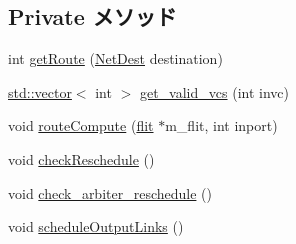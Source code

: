 \subsection*{Private メソッド}
\begin{DoxyCompactItemize}
\item 
int \hyperlink{classRouter_a2e327aa228d7975550910a9dfc67e222}{getRoute} (\hyperlink{classNetDest}{NetDest} destination)
\item 
\hyperlink{classstd_1_1vector}{std::vector}$<$ int $>$ \hyperlink{classRouter_a1a1889612585bf284775701c742a8449}{get\_\-valid\_\-vcs} (int invc)
\item 
void \hyperlink{classRouter_aeb1ad1b60d443efcb72a73917e20bbd1}{routeCompute} (\hyperlink{classflit}{flit} $\ast$m\_\-flit, int inport)
\item 
void \hyperlink{classRouter_af954e8e2150e2ce2e1b87081bbd9c678}{checkReschedule} ()
\item 
void \hyperlink{classRouter_a16c0664c8f37fe80b30fd3e7cd90fa33}{check\_\-arbiter\_\-reschedule} ()
\item 
void \hyperlink{classRouter_a4a8dc105bd8d06865d65c708e3e21188}{scheduleOutputLinks} ()
\end{DoxyCompactItemize}
